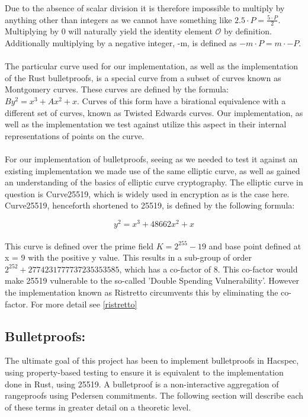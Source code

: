 \documentclass{article}
\begin{document}
\noindent
Due to the absence of scalar division it is therefore impossible to multiply by anything other than integers as we cannot have something like $2.5 \cdot P = \frac{5\cdot P}{2}$. Multiplying by 0 will naturally yield the identity element $\mathcal{O}$ by definition. Additionally multiplying by a negative integer, -m, is defined as $-m\cdot P = m\cdot -P$. 
\\\\
The particular curve used for our implementation, as well as the implementation of the Rust bulletproofs, is a special curve from a subset of curves known as Montgomery curves. These curves are defined by the formula: $By^2 = x^3 + Ax^2 + x$. Curves of this form have a birational equivalence with a different set of curves, known as Twisted Edwards curves. Our implementation, as well as the implementation we test against utilize this aspect in their internal representations of points on the curve.
\\\\
For our implementation of bulletproofs, seeing as we needed to test it against an existing implementation we made use of the same elliptic curve, as well as gained an understanding of the basics of elliptic curve cryptography. The elliptic curve in question is Curve25519, which is widely used in encryption as is the case here. Curve25519, henceforth shortened to 25519, is defined by the following formula:

$$y^2 = x^3 + 48662x^2 + x$$
\\
\noindent This curve is defined over the prime field $K = 2^{255} - 19$ and base point defined at x = 9 with the positive y value. This results in a sub-group of order $2^{252} + 2774231777737235353585$, which has a co-factor of 8. This co-factor would make 25519 vulnerable to the so-called 'Double Spending Vulnerability'. However the implementation known as Ristretto circumvents this by eliminating the co-factor. For more detail see \ref{ristretto} 

\subsection{Bulletproofs:}\label{Bulletproofs}

\noindent
The ultimate goal of this project has been to implement bulletproofs in Hacspec, using property-based testing to ensure it is equivalent to the implementation done in Rust, using 25519. A bulletproof is a non-interactive aggregation of rangeproofs using Pedersen commitments. The following section will describe each of these terms in greater detail on a theoretic level.
\end{document}
